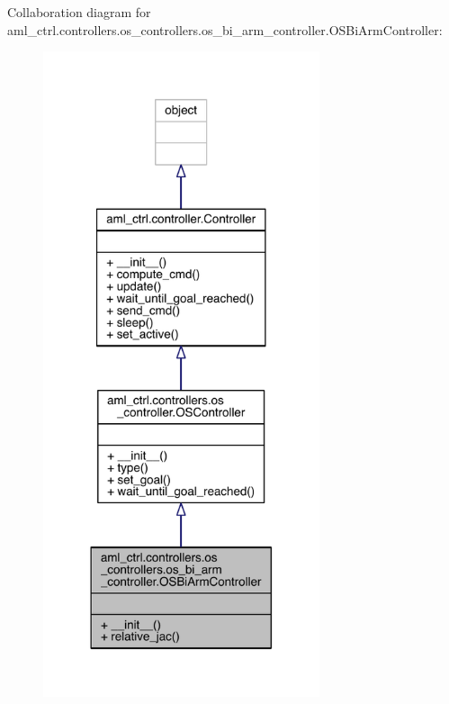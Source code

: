 Collaboration diagram for aml\+\_\+ctrl.\+controllers.\+os\+\_\+controllers.\+os\+\_\+bi\+\_\+arm\+\_\+controller.\+O\+S\+Bi\+Arm\+Controller\+:\nopagebreak
\begin{figure}[H]
\begin{center}
\leavevmode
\includegraphics[width=230pt]{classaml__ctrl_1_1controllers_1_1os__controllers_1_1os__bi__arm__controller_1_1_o_s_bi_arm_controller__coll__graph}
\end{center}
\end{figure}
